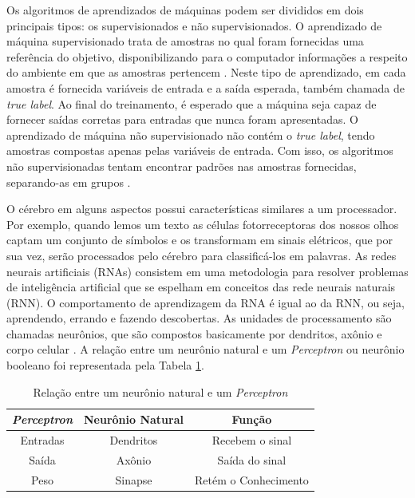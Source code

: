 \documentclass[conference]{IEEEtran}
\begin{document}
Os algoritmos de aprendizados de máquinas podem ser divididos em dois principais tipos: os supervisionados e não supervisionados. O aprendizado de máquina supervisionado trata de amostras no qual foram fornecidas uma referência do objetivo, disponibilizando para o computador informações a respeito do ambiente em que as amostras pertencem \cite{marr2017}. Neste tipo de aprendizado, em cada amostra é fornecida variáveis de entrada e a saída esperada, também chamada de \textit{true label}. Ao final do treinamento, é esperado que a máquina seja capaz de fornecer saídas corretas para entradas que nunca foram apresentadas. O aprendizado de máquina não supervisionado não contém o \textit{true label}, tendo amostras compostas apenas pelas variáveis de entrada. Com isso, os algoritmos não supervisionadas tentam encontrar padrões nas amostras fornecidas, separando-as em grupos \cite{marr2017}.


O cérebro em alguns aspectos possui características similares a um processador. Por exemplo, quando lemos um texto as células fotorreceptoras dos nossos olhos captam um conjunto de símbolos e os transformam em sinais elétricos, que por sua vez, serão processados pelo cérebro para classificá-los em palavras. As redes neurais artificiais (RNAs) consistem em uma metodologia para resolver problemas de inteligência artificial que se espelham em conceitos das rede neurais naturais (RNN). O comportamento de aprendizagem da RNA é igual ao da RNN, ou seja, aprendendo, errando e fazendo descobertas. As unidades de processamento são chamadas neurônios, que são compostos basicamente por dendritos, axônio e corpo celular \cite{kovacs96}. A relação entre um neurônio natural e um \textit{Perceptron} ou neurônio booleano foi representada pela Tabela \ref{table:tabelaComparativaNeuronioPerceptron}.

\renewcommand\tablename{TABELA}
\begin{table}[!h]
	\renewcommand{\arraystretch}{1.3}
	\caption{Relação entre um neurônio natural e um \textit{Perceptron}}
	\label{table:tabelaComparativaNeuronioPerceptron}
	\centering
	\begin{tabular}{|c|c|c|}
		\hline
		\textbf{\textit{Perceptron}} & \textbf{Neurônio Natural} & \textbf{Função}\\
		\hline
		Entradas & Dendritos & Recebem o sinal \\		
		\hline
		Saída & Axônio & Saída do sinal \\		
		\hline
		Peso & Sinapse & Retém o Conhecimento \\		
		\hline
	\end{tabular}
\end{table}
\end{document}
